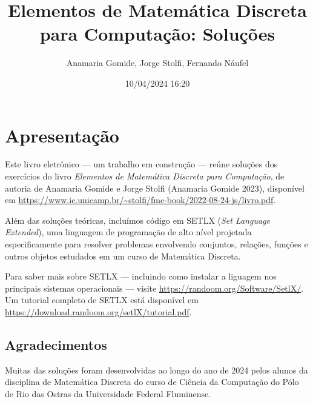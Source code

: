 \documentclass[
  letterpaper,
  DIV=11,
  numbers=noendperiod]{scrreprt}
\title{Elementos de Matemática Discreta para Computação: Soluções}
\author{Anamaria Gomide, Jorge Stolfi, Fernando Náufel}
\date{10/04/2024 16:20}
\renewcommand*\contentsname{Índice}
\newcommand\contentsname{Índice}
\begin{document}
\maketitle

\makeatletter
{}
{}
{}
\makeatother


\renewcommand*\contentsname{Índice}
{
\hypersetup{linkcolor=}
\setcounter{tocdepth}{2}
\tableofcontents
}

\chapter*{Apresentação}\label{apresentauxe7uxe3o}


Este livro eletrônico --- um trabalho em construção --- reúne soluções
dos exercícios do livro \emph{Elementos de Matemática Discreta para
Computação}, de autoria de Anamaria Gomide e Jorge Stolfi (Anamaria
Gomide 2023), disponível em
\url{https://www.ic.unicamp.br/~stolfi/fmc-book/2022-08-24-js/livro.pdf}.

Além das soluções teóricas, incluímos código em SETLX (\emph{Set
Language Extended}), uma linguagem de programação de alto nível
projetada especificamente para resolver problemas envolvendo conjuntos,
relações, funções e outros objetos estudados em um curso de Matemática
Discreta.

Para saber mais sobre SETLX --- incluindo como instalar a liguagem nos
principais sistemas operacionais --- visite
\url{https://randoom.org/Software/SetlX/}. Um tutorial completo de SETLX
está disponível em
\url{https://download.randoom.org/setlX/tutorial.pdf}.

\section*{Agradecimentos}\label{agradecimentos}


Muitas das soluções foram desenvolvidas ao longo do ano de 2024 pelos
alunos da disciplina de Matemática Discreta do curso de Ciência da
Computação do Pólo de Rio das Ostras da Universidade Federal Fluminense.
\end{document}
